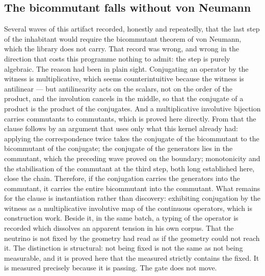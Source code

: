 \documentclass[11pt]{article}
\theoremstyle{definition}\newtheorem{deriv}{Derivation}
\begin{document}
\subsection*{The bicommutant falls without von Neumann}Several waves of this artifact recorded, honestly and repeatedly, that the last step of the inhabitant would require the bicommutant theorem of von Neumann, which the library does not carry. That record was wrong, and wrong in the direction that costs this programme nothing to admit: the step is purely algebraic. The reason had been in plain sight. Conjugating an operator by the witness is multiplicative, which seems counterintuitive because the witness is antilinear --- but antilinearity acts on the scalars, not on the order of the product, and the involution cancels in the middle, so that the conjugate of a product is the product of the conjugates. And a multiplicative involutive bijection carries commutants to commutants, which is proved here directly. From that the clause follows by an argument that uses only what this kernel already had: applying the correspondence twice takes the conjugate of the bicommutant to the bicommutant of the conjugate; the conjugate of the generators lies in the commutant, which the preceding wave proved on the boundary; monotonicity and the stabilisation of the commutant at the third step, both long established here, close the chain. Therefore, if the conjugation carries the generators into the commutant, it carries the entire bicommutant into the commutant. What remains for the clause is instantiation rather than discovery: exhibiting conjugation by the witness as a multiplicative involutive map of the continuous operators, which is construction work. Beside it, in the same batch, a typing of the operator is recorded which dissolves an apparent tension in his own corpus. That the neutrino is not fixed by the geometry had read as if the geometry could not reach it. The distinction is structural: not being fixed is not the same as not being measurable, and it is proved here that the measured strictly contains the fixed. It is measured precisely because it is passing. The gate does not move.
\end{document}
